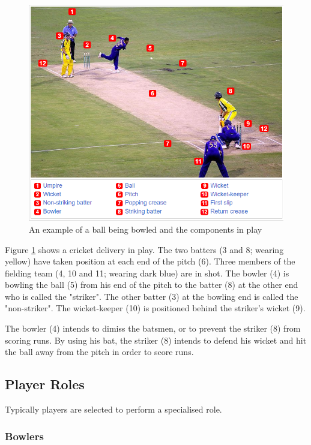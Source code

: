\documentclass[12pt,a4paper]{report}
\theoremstyle{definition}
\begin{document}
\begin{figure}[H]
    \centering
    \includegraphics[width=0.8\linewidth]{Cricket_Delivery.png}
    \caption{An example of a ball being bowled and the components in play \citep{cricketWiki}}
    \label{fig:Delivery}
\end{figure}

Figure \ref{fig:Delivery} shows a cricket delivery in play. 
The two batters (3 and 8; wearing yellow) have taken position at each end of the pitch (6). 
Three members of the fielding team (4, 10 and 11; wearing dark blue) are in shot. 
The bowler (4) is bowling the ball (5) from his end of the pitch to the batter (8) at the other end who is called the "striker". 
The other batter (3) at the bowling end is called the "non-striker". 
The wicket-keeper (10) is positioned behind the striker's wicket (9).

The bowler (4) intends to dimiss the batsmen, or to prevent the striker (8) from scoring runs. 
By using his bat, the striker (8) intends to defend his wicket and hit the ball away from the pitch in order to score runs.

\subsection{Player Roles}

Typically players are selected to perform a specialised role.

\subsubsection{Bowlers}
\end{document}
